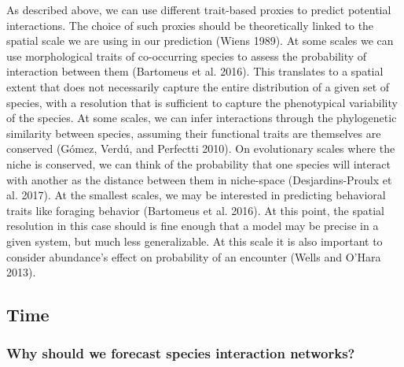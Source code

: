 \documentclass[11pt]{article}
\begin{document}
As described above, we can use different trait-based proxies to predict
potential interactions. The choice of such proxies should be
theoretically linked to the spatial scale we are using in our prediction
(Wiens 1989). At some scales we can use morphological traits of
co-occurring species to assess the probability of interaction between
them (Bartomeus et al. 2016). This translates to a spatial extent that
does not necessarily capture the entire distribution of a given set of
species, with a resolution that is sufficient to capture the
phenotypical variability of the species. At some scales, we can infer
interactions through the phylogenetic similarity between species,
assuming their functional traits are themselves are conserved (Gómez,
Verdú, and Perfectti 2010). On evolutionary scales where the niche is
conserved, we can think of the probability that one species will
interact with another as the distance between them in niche-space
(Desjardins-Proulx et al. 2017). At the smallest scales, we may be
interested in predicting behavioral traits like foraging behavior
(Bartomeus et al. 2016). At this point, the spatial resolution in this
case should is fine enough that a model may be precise in a given
system, but much less generalizable. At this scale it is also important
to consider abundance's effect on probability of an encounter (Wells and
O'Hara 2013).

\hypertarget{time}{%
\subsection{Time}\label{time}}

\hypertarget{why-should-we-forecast-species-interaction-networks}{%
\subsubsection{Why should we forecast species interaction
networks?}\label{why-should-we-forecast-species-interaction-networks}}
\end{document}
